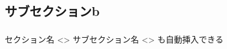 \subsection{サブセクションb}
\begin{frame}{}
  \frametitle{\insertsubsection}
  セクション名
  <\insertsection>
  サブセクション名
  <\insertsubsection>
  も自動挿入できる
\end{frame}

